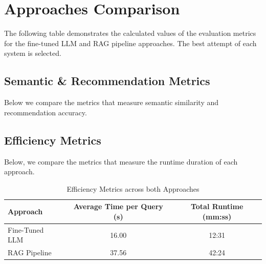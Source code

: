 \section{Approaches Comparison}

The following table demonstrates the calculated values of the evaluation metrics for the fine-tuned LLM and RAG pipeline approaches. The best attempt of each system is selected. 


\subsection{Semantic \& Recommendation Metrics}

Below we compare the metrics that measure semantic similarity and recommendation accuracy.

\begin{table}[h!]
    \centering
    \caption{Semantic \& Recommendation Metrics across both Approaches}
    \label{tab:results_ft_rag}
\end{table}

\subsection{Efficiency Metrics}

Below, we compare the metrics that measure the runtime duration of each approach.

\begin{table}[h!]
    \centering
    \caption{Efficiency Metrics across both Approaches}
    \label{tab:results_ft_rag_time}
    \begin{tabular}{lcc}
    \hline
    \textbf{Approach} & \textbf{Average Time per Query (s)} & \textbf{Total Runtime (mm:ss)} \\
    \hline
    Fine-Tuned LLM & 16.00 & 12:31 \\
    RAG Pipeline   & 37.56 & 42:24 \\
    \hline
    \end{tabular}
\end{table}


